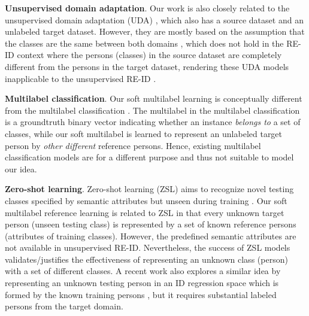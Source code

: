 \documentclass[10pt,twocolumn,letterpaper]{article}
\newcommand{\Koven}{\color{black}}
\begin{document}
\vspace{0.1cm}
\noindent
\textbf{Unsupervised domain adaptation}.
Our work is also closely related to the unsupervised domain adaptation (UDA)
\cite{2015_ICML_DAN,2016_AAAI_CORAL,2016_ECCVW_CORAL,2018_ICLR_DIRTY,2018_ICLR_EM,2017_CVPR_ADDA,2015_ICML_backpropagation,2017_ICML_JAN},
which also has a source dataset
and an unlabeled target dataset.
However, they are mostly based on the assumption that the classes are the same between both domains \cite{2010_ML_bendavid,2010_TKDE_survey,2017_Arxiv_DA-survey,2011_TNN_TCA},
which does not hold in the RE-ID context
where the persons (classes) in the source dataset are completely different from the persons in the target dataset,
rendering these UDA models inapplicable to the unsupervised RE-ID \cite{2018_CVPR_PTGAN,2018_CVPR_SPGAN,2018_ECCV_HHL,2018_CVPR_transferable}.

\vspace{0.1cm}
\noindent
\textbf{Multilabel classification}.
Our soft multilabel learning is conceptually different from the multilabel classification \cite{2014_TKDE_multilabel}.
The multilabel in the multilabel classification \cite{2014_TKDE_multilabel} is a groundtruth binary vector indicating
whether an instance \emph{belongs to} a set of classes,
while our soft multilabel is learned to represent an unlabeled target person
by \emph{other different} reference persons.
{\Koven
Hence, existing multilabel classification models are for a different purpose and thus not suitable to model our idea.
}

\vspace{0.1cm}
\noindent
\textbf{Zero-shot learning}.
Zero-shot learning (ZSL) aims to recognize novel testing classes specified by semantic attributes but unseen during training \cite{2009_CVPR_ZSL,2015_ICML_ZSL,2015_ICCV_ZSL,2015_ICCV_UDA4ZSL,2016_CVPR_ZSL}.
Our soft multilabel reference learning is related to ZSL in that
every unknown target person (unseen testing class) is represented by a set of known
reference persons (attributes of training classes).
However, the predefined semantic attributes are not available in unsupervised RE-ID.
Nevertheless, the success of ZSL models validates/justifies the effectiveness of
representing an unknown class (person) with a set of different classes.
A recent work also explores a similar idea by representing an unknown testing person in an ID regression space
which is formed by the known training persons \cite{2018_IJCV_ID-regression},
but it requires substantial labeled persons from the target domain.
\end{document}
